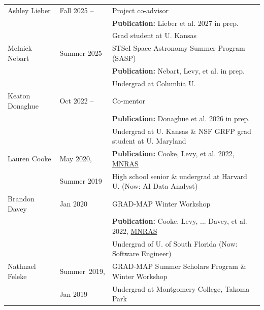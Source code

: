 \documentclass[11pt]{article}
\begin{document}
\begin{longtable}{p{}p{}p{}}

Ashley Lieber & Fall 2025 -- & Project co-advisor\\
&& {\bf Publication:} Lieber et al. 2027 in prep.\\
& & {\small Grad student at U. Kansas}\medskip\\

Melnick Nebart & Summer 2025 & STScI Space Astronomy Summer Program (SASP) \\
&& {\bf Publication:} Nebart, Levy, et al. in prep.\\
& & {\small Undergrad at Columbia U.}\medskip\\

Keaton Donaghue  & Oct 2022 -- & Co-mentor\\ 
 && {\bf Publication:} Donaghue et al. 2026 in prep.\\ 
 & & {\small Undergrad at U. Kansas  \& NSF GRFP grad student at U. Maryland}\medskip\\

Lauren Cooke& May 2020,&{\bf Publication:} Cooke, Levy, et al. 2022, \href{https://ui.adsabs.harvard.edu/abs/2022MNRAS.512.1012C/abstract}{MNRAS} \\
&  Summer 2019  & {\small High school senior \& undergrad at Harvard U. (Now: AI Data Analyst)}\medskip\\

 Brandon Davey& Jan 2020  & GRAD-MAP Winter Workshop\\
& & {\bf Publication:} Cooke, Levy, ... Davey, et al. 2022, \href{https://ui.adsabs.harvard.edu/abs/2022MNRAS.512.1012C/abstract}{MNRAS}\\
 & & {\small Undergrad of U. of South Florida (Now: Software Engineer)}\medskip\\

 Nathnael Feleke & \mbox{Summer 2019,} & GRAD-MAP Summer Scholars Program \& Winter Workshop\\
 & Jan 2019& {\small Undergrad at Montgomery College, Takoma Park}\medskip\\


\end{longtable}
\end{document}
